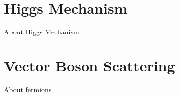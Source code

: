 \begin{figure}[!ht]
\begin{minipage}{0.16\textwidth}
  \end{minipage}
\end{figure}

\section{Higgs Mechanism}

About Higgs Mechanism

\section{Vector Boson Scattering}

About fermions